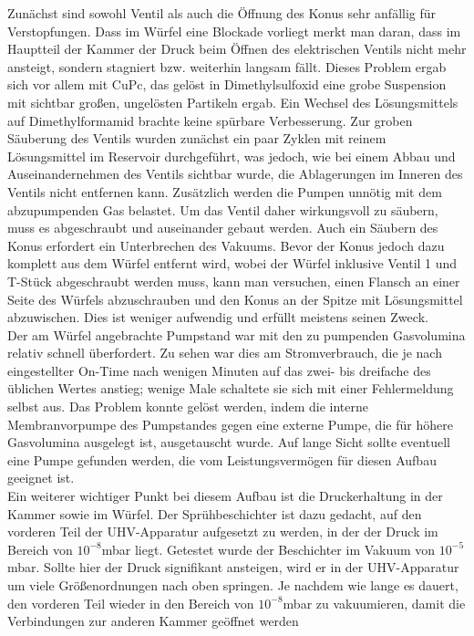 Zunächst sind sowohl Ventil als auch die Öffnung des Konus sehr anfällig für Verstopfungen. Dass im
Würfel eine Blockade vorliegt merkt man daran, dass im Hauptteil der Kammer der
Druck beim Öffnen des elektrischen Ventils nicht mehr ansteigt, sondern stagniert bzw. weiterhin
langsam fällt. Dieses Problem ergab sich vor allem mit CuPc, das gelöst in Dimethylsulfoxid eine
grobe Suspension mit sichtbar großen, ungelösten Partikeln ergab. Ein Wechsel des Lösungsmittels auf
Dimethylformamid brachte keine spürbare Verbesserung. Zur groben Säuberung des Ventils wurden
zunächst ein paar Zyklen mit reinem Lösungsmittel im Reservoir durchgeführt, was jedoch, wie bei
einem Abbau und Auseinandernehmen des Ventils sichtbar wurde, die Ablagerungen im Inneren des
Ventils nicht entfernen kann. Zusätzlich werden die Pumpen unnötig mit dem abzupumpenden Gas
belastet. Um das Ventil daher wirkungsvoll zu säubern, muss es abgeschraubt und auseinander gebaut
werden. Auch ein Säubern des Konus erfordert ein Unterbrechen des Vakuums. Bevor der Konus jedoch
dazu komplett aus dem Würfel entfernt wird, wobei der Würfel inklusive Ventil 1 und T-Stück
abgeschraubt werden muss, kann man versuchen, einen Flansch an einer Seite des Würfels abzuschrauben
und den Konus an der Spitze mit Lösungsmittel abzuwischen. Dies ist weniger aufwendig und
erfüllt meistens seinen Zweck.\\
Der am Würfel angebrachte Pumpstand war mit den zu pumpenden Gasvolumina relativ schnell
überfordert. Zu sehen war dies am Stromverbrauch, die je nach eingestellter On-Time nach
wenigen Minuten auf das zwei- bis dreifache des üblichen Wertes anstieg; wenige Male schaltete sie
sich mit einer Fehlermeldung selbst aus. Das Problem konnte gelöst werden, indem die interne
Membranvorpumpe des Pumpstandes gegen eine externe Pumpe, die für höhere Gasvolumina ausgelegt ist,
ausgetauscht wurde.
Auf lange Sicht sollte eventuell eine Pumpe gefunden werden, die vom Leistungsvermögen für diesen
Aufbau geeignet ist.\\
Ein weiterer wichtiger Punkt bei diesem Aufbau ist die Druckerhaltung in der Kammer sowie im Würfel.
Der Sprühbeschichter ist dazu gedacht, auf den vorderen Teil der UHV-Apparatur aufgesetzt zu werden,
in der der Druck im Bereich von $10^{-8}$mbar liegt. Getestet wurde der Beschichter im Vakuum von
$10^{-5}$mbar. Sollte hier der Druck signifikant ansteigen, wird er in der UHV-Apparatur um viele
Größenordnungen nach oben springen. Je nachdem wie lange es dauert, den vorderen Teil wieder in den
Bereich von $10^{-8}$mbar zu vakuumieren, damit die Verbindungen zur anderen Kammer geöffnet werden
